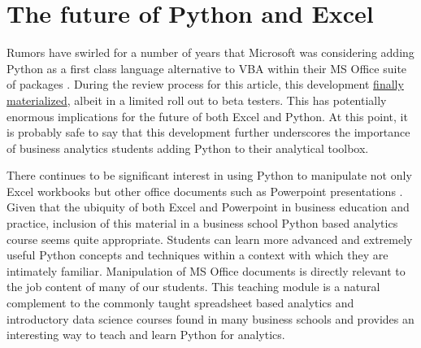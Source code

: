 \documentclass[ited,blindrev]{informs3}              %
\begin{document}
\section{The future of Python and Excel}
\label{sec:future}

Rumors have swirled for a number of years that Microsoft was considering adding Python as a first class language alternative to VBA within their MS Office suite of packages \cite{cimpanuMicrosoftConsidersAdding2017}. During the review process for this article, this development \href{https://techcommunity.microsoft.com/t5/excel-blog/announcing-python-in-excel-combining-the-power-of-python-and-the/ba-p/3893439}{finally materialized}, albeit in a limited roll out to beta testers. This has potentially enormous implications for the future of both Excel and Python. At this point, it is probably safe to say that this development further underscores the importance of business analytics students adding Python to their analytical toolbox. 

There continues to be significant interest in using Python to manipulate not only Excel workbooks but other office documents such as Powerpoint presentations \citep{cannyPythonpptx2013}. Given that the ubiquity of both Excel and Powerpoint in business education and practice, inclusion of this material in a business school Python based analytics course seems quite appropriate. Students can learn more advanced and extremely useful Python concepts and techniques within a context with which they are intimately familiar. Manipulation of MS Office documents is directly relevant to the job content of many of our students. This teaching module is a natural complement to the commonly taught spreadsheet based analytics and introductory data science courses found in many business schools and provides an interesting way to teach and learn Python for analytics.



\ACKNOWLEDGMENT{%
}%


%
%
%
\end{document}
